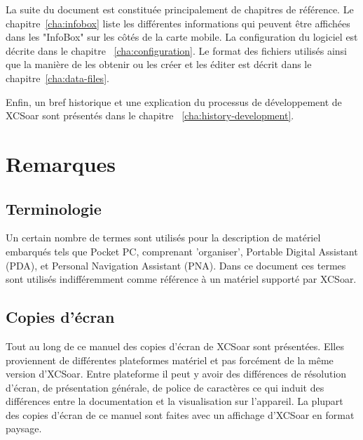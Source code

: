 La suite du document est constituée principalement de chapitres de référence. Le chapitre~\ref{cha:infobox} liste les différentes informations qui peuvent être affichées dans les "InfoBox" sur les côtés de la carte mobile. La configuration du logiciel est décrite dans le chapitre ~\ref{cha:configuration}. Le format des fichiers utilisés ainsi que la manière de les obtenir ou les créer et les éditer est décrit dans le chapitre~\ref{cha:data-files}.

Enfin, un bref historique et une explication du processus de développement de XCSoar sont présentés dans le chapitre ~\ref{cha:history-development}.

\section{Remarques}

\subsection*{Terminologie}
Un certain nombre de termes sont utilisés pour la description de matériel embarqués tels que Pocket PC, comprenant 'organiser', Portable Digital Assistant (PDA), et Personal Navigation Assistant (PNA). Dans ce document ces termes sont utilisés indifféremment comme référence à un matériel supporté par XCSoar.

\subsection*{Copies d'écran}
Tout au long de ce manuel des copies d'écran de XCSoar sont présentées. Elles proviennent de différentes plateformes matériel et pas forcément de la même version d'XCSoar. Entre plateforme il peut y avoir des différences de résolution d'écran, de présentation générale, de police de caractères ce qui induit des différences entre la documentation et la visualisation sur l'appareil. La plupart des copies d'écran de ce manuel sont faites avec un affichage d'XCSoar en format paysage.

